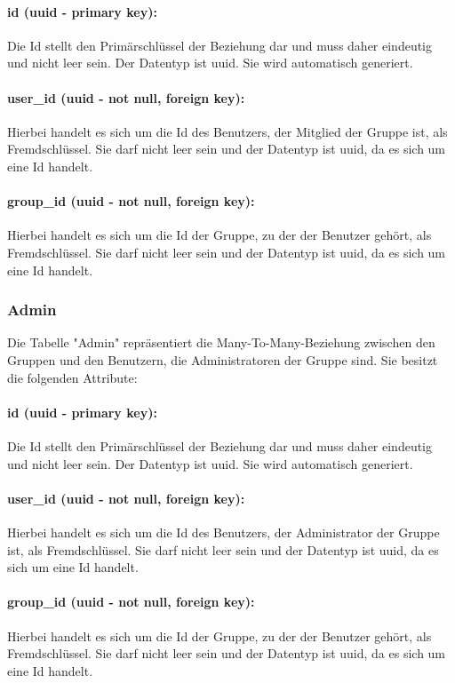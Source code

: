 \documentclass[parskip=full]{scrartcl}
\begin{document}
\paragraph{id (uuid - primary key):} Die Id stellt den Primärschlüssel der Beziehung dar und muss daher eindeutig und nicht leer sein. Der Datentyp ist \Gls{uuid}. Sie wird automatisch generiert.
\paragraph{user\_id (uuid - not null, foreign key):} Hierbei handelt es sich um die Id des Benutzers, der Mitglied der Gruppe ist, als Fremdschlüssel. Sie darf nicht leer sein und der Datentyp ist \Gls{uuid}, da es sich um eine Id handelt.
\paragraph{group\_id (uuid - not null, foreign key):} Hierbei handelt es sich um die Id der Gruppe, zu der der Benutzer gehört, als Fremdschlüssel. Sie darf nicht leer sein und der Datentyp ist \Gls{uuid}, da es sich um eine Id handelt.
\newpage
\subsubsection{Admin}
Die Tabelle "Admin" repräsentiert die Many-To-Many-Beziehung zwischen den Gruppen und den Benutzern, die Administratoren der Gruppe sind. Sie besitzt die folgenden Attribute:
\paragraph{id (uuid - primary key):} Die Id stellt den Primärschlüssel der Beziehung dar und muss daher eindeutig und nicht leer sein. Der Datentyp ist \Gls{uuid}. Sie wird automatisch generiert.
\paragraph{user\_id (uuid - not null, foreign key):} Hierbei handelt es sich um die Id des Benutzers, der Administrator der Gruppe ist, als Fremdschlüssel. Sie darf nicht leer sein und der Datentyp ist \Gls{uuid}, da es sich um eine Id handelt.
\paragraph{group\_id (uuid - not null, foreign key):} Hierbei handelt es sich um die Id der Gruppe, zu der der Benutzer gehört, als Fremdschlüssel. Sie darf nicht leer sein und der Datentyp ist \Gls{uuid}, da es sich um eine Id handelt.
\newpage
\end{document}
